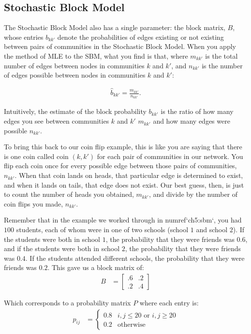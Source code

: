 \subsection{Stochastic Block Model}

The Stochastic Block Model also has a single parameter: the block matrix, $B$, whose entries $b_{kk'}$ denote the probabilities of edges existing or not existing between pairs of communities in the Stochastic Block Model. When you apply the method of MLE to the SBM, what you find is that, where $m_{kk'}$ is the total number of edges between nodes in communities $k$ and $k'$, and $n_{kk'}$ is the number of edges possible between nodes in communities $k$ and $k'$:

\begin{align*}
    \hat b_{kk'} = \frac{m_{kk'}}{n_{kk'}}.
\end{align*}

Intuitively, the estimate of the block probability $b_{kk'}$ is the ratio of how many edges you see between communities $k$ and $k'$ $m_{kk'}$ and how many edges were possible $n_{kk'}$.

To bring this back to our coin flip example, this is like you are saying that there is one coin called coin $(k, k')$ for each pair of communities in our network. You flip each coin once for every possible edge between those pairs of communities, $n_{kk'}$. When that coin lands on heads, that particular edge is determined to exist, and when it lands on tails, that edge does not exist. Our best guess, then, is just to count the number of heads you obtained, $m_{kk'}$, and divide by the number of coin flips you made, $n_{kk'}$. 

Remember that in the example we worked through in {numref}`ch5:sbm`, you had $100$ students, each of whom were in one of two schools (school $1$ and school $2$). If the students were both in school $1$, the probability that they were friends was $0.6$, and if the students were both in school $2$, the probability that they were friends was $0.4$. If the students attended different schools, the probability that they were friends was $0.2$. This gave us a block matrix of:
\begin{align*}
    B &= \begin{bmatrix}
        .6 & .2 \\
        .2 & .4
    \end{bmatrix}
\end{align*}

Which corresponds to a probability matrix $P$ where each entry is:
\begin{align*}
    p_{ij} &= \begin{cases}
    0.8 & i, j \leq 20 \text{ or }i, j \geq 20 \\
    0.2 & \text{otherwise}
    \end{cases}
\end{align*}

